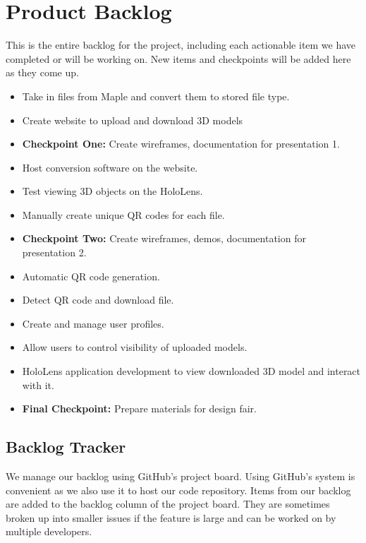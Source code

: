 



\section{Product Backlog}


This is the entire backlog for the project, including each actionable item we 
have completed or will be working on. New items and checkpoints will be added 
here as they come up.

\begin{itemize}
\item Take in files from Maple and convert them to stored file type.
\item Create website to upload and download 3D models
\item \textbf{Checkpoint One:} Create wireframes, documentation for presentation 1.
\item Host conversion software on the website.
\item Test viewing 3D objects on the HoloLens.
\item Manually create unique QR codes for each file. 
\item \textbf{Checkpoint Two:} Create wireframes, demos, documentation for presentation 
2.
\item Automatic QR code generation.
\item Detect QR code and download file.
\item Create and manage user profiles.
\item Allow users to control visibility of uploaded models.
\item HoloLens application development to view downloaded 3D model and interact 
with it.
\item \textbf{Final Checkpoint:} Prepare materials for design fair.
\end{itemize}

\subsection{Backlog Tracker}

We manage our backlog using GitHub's project board. Using GitHub's system is 
convenient as we also use it to host our code repository. Items from our backlog 
are added to the backlog column of the project board. They are sometimes broken 
up into smaller issues if the feature is large and can be worked on by multiple 
developers.

